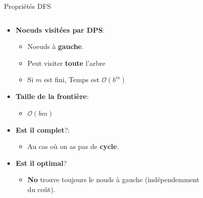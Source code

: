 \documentclass{beamer}
\begin{document}
\begin{frame}[t]{Propriétés DFS}
  
 \begin{columns}
   \begin{column}{0.5\textwidth}
     \begin{itemize}
       \small
     \item \textbf{Noeuds visitées par DPS}:
         \begin{itemize}
         \scriptsize
       \item Noeuds à \textbf{gauche}.
           \item Peut visiter \textbf{toute} l'arbre
           \item Si $m$ est fini, Temps est \alert{$\mathcal{O}(b^m)$} 
         \end{itemize}
       \item \textbf{Taille de la frontière}:
         \begin{itemize}
           \scriptsize
         \item<2-> \alert{$\mathcal{O}(bm)$}
         \end{itemize}

       \item \textbf{Est il complet}?:
           \begin{itemize}
             \scriptsize
             \item Au cas où on as pas de \alert{\textbf{cycle}}.
           \end{itemize}
         \item \textbf{Est il optimal}?
            \begin{itemize}
              \scriptsize
            \item \textbf{\alert{No}} trouve toujours  le nouds à gauche
              (indépendemment du coût).
            \end{itemize}
     \end{itemize}
   \end{column}
   \begin{column}{0.5\textwidth}
     \begin{figure}[htpb]
     \begin{center}
\end{center}
\end{figure}
\end{column}
\end{columns}
\end{frame}
\end{document}
